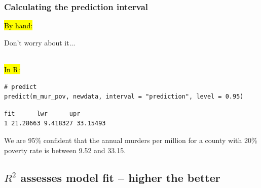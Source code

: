 \documentclass[slidestop,compress,mathserif,12pt,t,professionalfonts,xcolor=table]{beamer}
\begin{document}

\begin{frame}[fragile]
\frametitle{Calculating the prediction interval}

\hl{By hand:}

Don't worry about it...

\pause

$\:$ \\

\hl{In R:}

{\scriptsize
\begin{Verbatim}[frame=single, formatcom=\color{blue}]
# predict
predict(m_mur_pov, newdata, interval = "prediction", level = 0.95)
\end{Verbatim}
}

\pause

{\scriptsize
\begin{Verbatim}[frame=single, formatcom=\color{gray}]
       fit      lwr      upr
1 21.28663 9.418327 33.15493
\end{Verbatim}
}

\pause

We are 95\% confident that the annual murders per million for a county with 20\%
poverty rate is between 9.52 and 33.15.

\end{frame}


\subsection{$R^2$ assesses model fit -- higher the better}
\label{mi3}

\end{document}
